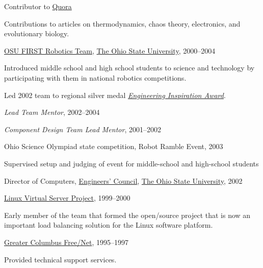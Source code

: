 \documentclass[10pt]{article}           %
\newcommand{\halfblankline}{\quad\vspace{-0.5\baselineskip}\pagebreak[3]}
\begin{document}
\halfblankline

Contributor to \href{http://www.quora.com/}{Quora}
%
\begin{innerlist}
    \item Contributions to articles on thermodynamics, chaos theory,
        electronics, and evolutionary biology.
\end{innerlist}

\halfblankline

\href{http://www.osufirst.org/}{OSU FIRST Robotics Team},
\href{http://www.osu.edu}{The Ohio State University}, 2000--2004
\begin{innerlist}
\item Introduced middle school and high school students to science and
        technology by participating with them in national robotics
        competitions.
\item Led 2002 team to regional silver medal
        \href{http://www.firstwiki.org/Engineering_Inspiration_Award}
             {\emph{Engineering Inspiration Award}}.
\item \emph{Lead Team Mentor}, 2002--2004
\item \emph{Component Design Team Lead Mentor}, 2001--2002
\end{innerlist}

\halfblankline

Ohio Science Olympiad state competition, Robot Ramble Event, 2003
%
\begin{innerlist}
    \item Supervised setup and judging of event for middle-school and
        high-school students
\end{innerlist}

\halfblankline

Director of Computers,
\href{http://ec.osu.edu/}{Engineers' Council},
\href{http://www.osu.edu/}{The Ohio State University}, 2002

\halfblankline

\href{http://www.linuxvirtualserver.org/}
     {Linux Virtual Server Project}, 1999--2000
\begin{innerlist}
\item Early member of the team that formed the open\-/source project that
        is now an important load balancing solution for the Linux
        software platform.
\end{innerlist}

\halfblankline

\href{http://www.gcfn.org/}
     {Greater Columbus Free\-/Net}, 1995--1997
\begin{innerlist}
\item Provided technical support services.
\end{innerlist}
\end{document}
